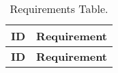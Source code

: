 
\begin{longtable}{|c|>{\raggedright\arraybackslash}m{15cm}|}
	\caption{\label{tab:allReq}Requirements Table.}\hline
    \endfirsthead
    \endhead 

    \hline
    \textbf{ID} & \textbf{Requirement}\\\hline
    \endfirsthead
    
    \hline
    \textbf{ID} & \textbf{Requirement}\\\hline
    \endhead 
 

\end{longtable}
